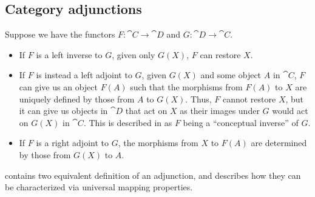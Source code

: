 \subsection{Category adjunctions}\label{subsec:category_adjunctions}

\begin{remark}\label{rem:adjoint_functors}
  Suppose we have the functors \( F: \cat{C} \to \cat{D} \) and \( G: \cat{D} \to \cat{C} \).

  \begin{itemize}
    \item If \( F \) is a left inverse to \( G \), given only \( G(X) \), \( F \) can restore \( X \).

    \item If \( F \) is instead a left adjoint to \( G \), given \( G(X) \) and some object \( A \) in \( \cat{C} \), \( F \) can give us an object \( F(A) \) such that the morphisms from \( F(A) \) to \( X \) are uniquely defined by those from \( A \) to \( G(X) \). Thus, \( F \) cannot restore \( X \), but it can give us objects in \( \cat{D} \) that act on \( X \) as their images under \( G \) would act on \( G(X) \) in \( \cat{C} \). This is described in \cite{StanfordPlato:category_theory} as \( F \) being a \enquote{conceptual inverse} of \( G \).

    \item If \( F \) is a right adjoint to \( G \), the morphisms from \( X \) to \( F(A) \) are determined by those from \( G(X) \) to \( A \).
  \end{itemize}

   contains two equivalent definition of an adjunction, and  describes how they can be characterized via universal mapping properties.
\end{remark}

